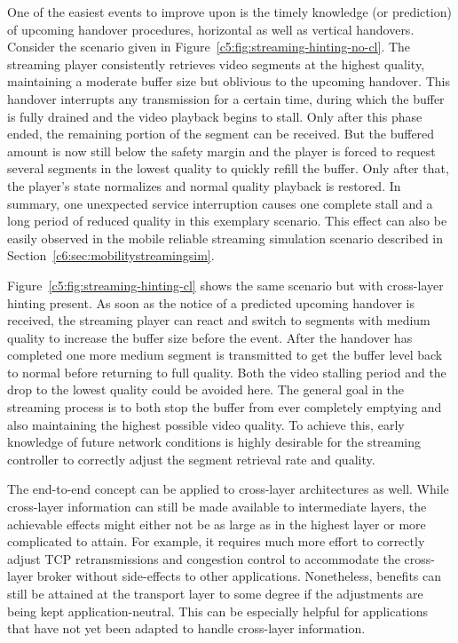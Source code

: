 One of the easiest events to improve upon is the timely knowledge (or prediction) of upcoming handover procedures, horizontal as well as vertical handovers. Consider the scenario given in Figure~\ref{c5:fig:streaming-hinting-no-cl}. The streaming player consistently retrieves video segments at the highest quality, maintaining a moderate buffer size but oblivious to the upcoming handover. This handover interrupts any transmission for a certain time, during which the buffer is fully drained and the video playback begins to stall. Only after this phase ended, the remaining portion of the segment can be received. But the buffered amount is now still below the safety margin and the player is forced to request several segments in the lowest quality to quickly refill the buffer. Only after that, the player's state normalizes and normal quality playback is restored. In summary, one unexpected service interruption causes one complete stall and a long period of reduced quality in this exemplary scenario. This effect can also be easily observed in the mobile reliable streaming simulation scenario described in Section~\ref{c6:sec:mobilitystreamingsim}.

Figure~\ref{c5:fig:streaming-hinting-cl} shows the same scenario but with cross-layer hinting present. As soon as the notice of a predicted upcoming handover is received, the streaming player can react and switch to segments with medium quality to increase the buffer size before the event. After the handover has completed one more medium segment is transmitted to get the buffer level back to normal before returning to full quality. Both the video stalling period and the drop to the lowest quality could be avoided here. The general goal in the streaming process is to both stop the buffer from ever completely emptying and also maintaining the highest possible video quality. To achieve this, early knowledge of future network conditions is highly desirable for the streaming controller to correctly adjust the segment retrieval rate and quality.

The end-to-end concept can be applied to cross-layer architectures as well. While cross-layer information can still be made available to intermediate layers, the achievable effects might either not be as large as in the highest layer or more complicated to attain. For example, it requires much more effort to correctly adjust \gls{TCP} retransmissions and congestion control to accommodate the cross-layer broker without side-effects to other applications. Nonetheless, benefits can still be attained at the transport layer to some degree if the adjustments are being kept application-neutral. This can be especially helpful for applications that have not yet been adapted to handle cross-layer information.


